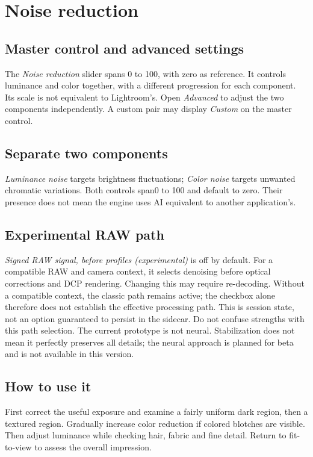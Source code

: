 \chapter{Noise reduction}
\section{Master control and advanced settings}
The \emph{Noise reduction} slider spans 0 to 100, with zero as reference.
It controls luminance and color together, with a different progression for
each component. Its scale is not equivalent to Lightroom's. Open
\emph{Advanced} to adjust the two components independently. A custom pair
may display \emph{Custom} on the master control.

\section{Separate two components}
\emph{Luminance noise} targets brightness fluctuations; \emph{Color noise}
targets unwanted chromatic variations. Both controls span0 to 100 and default
to zero. Their presence does not mean the engine uses AI equivalent to another
application's.

\section{Experimental RAW path}
\emph{Signed RAW signal, before profiles (experimental)} is off by default.
For a compatible RAW and camera context, it selects denoising before optical
corrections and DCP rendering. Changing this may require re-decoding.
Without a compatible context, the classic path remains active; the checkbox
alone therefore does not establish the effective processing path.
This is session state, not an option guaranteed to persist in the sidecar.
Do not confuse strengths with this path selection. The current prototype
is not neural. Stabilization does not mean it perfectly preserves all details;
the neural approach is planned for beta and is not available in this version.

\section{How to use it}
First correct the useful exposure and examine a fairly uniform dark region,
then a textured region. Gradually increase color reduction if colored blotches
are visible. Then adjust luminance while checking hair, fabric and fine detail.
Return to fit-to-view to assess the overall impression.

